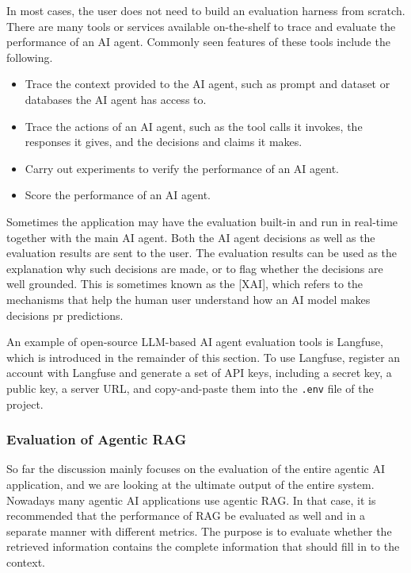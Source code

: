 In most cases, the user does not need to build an evaluation harness from scratch. There are many tools or services available on-the-shelf to trace and evaluate the performance of an AI agent. Commonly seen features of these tools include the following.
\begin{itemize}
  \item Trace the context provided to the AI agent, such as prompt and dataset or databases the AI agent has access to.
  \item Trace the actions of an AI agent, such as the tool calls it invokes, the responses it gives, and the decisions and claims it makes.
  \item Carry out experiments to verify the performance of an AI agent.
  \item Score the performance of an AI agent.
\end{itemize}

Sometimes the application may have the evaluation built-in and run in real-time together with the main AI agent. Both the AI agent decisions as well as the evaluation results are sent to the user. The evaluation results can be used as the explanation why such decisions are made, or to flag whether the decisions are well grounded. This is sometimes known as the [XAI], which refers to the mechanisms that help the human user understand how an AI model makes decisions pr predictions.

An example of open-source LLM-based AI agent evaluation tools is Langfuse, which is introduced in the remainder of this section. To use Langfuse, register an account with Langfuse and generate a set of API keys, including a secret key, a public key, a server URL, and copy-and-paste them into the \verb|.env| file of the project.

\subsubsection*{Evaluation of Agentic RAG}

So far the discussion mainly focuses on the evaluation of the entire agentic AI application, and we are looking at the ultimate output of the entire system. Nowadays many agentic AI applications use agentic RAG. In that case, it is recommended that the performance of RAG be evaluated as well and in a separate manner with different metrics. The purpose is to evaluate whether the retrieved information contains the complete information that should fill in to the context.

